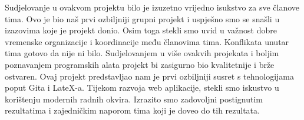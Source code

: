 		Sudjelovanje u ovakvom projektu bilo je izuzetno vrijedno isukstvo za sve članove tima. Ovo je bio naš prvi ozbiljniji grupni projekt i uspješno smo se snašli u izazovima koje je projekt donio. Osim toga stekli smo uvid u važnost dobre vremenske organizacije i koordinacije među članovima tima. Konflikata unutar tima gotovo da nije ni bilo. Sudjelovanjem u više ovakvih projekata i boljim poznavanjem programskih alata projekt bi zasigurno bio kvalitetnije i brže ostvaren. Ovaj projekt predstavljao nam je prvi ozbiljniji susret s tehnologijama poput Gita i LateX-a. Tijekom razvoja web aplikacije, stekli smo iskustvo u korištenju modernih radnih okvira. Izrazito smo zadovoljni postignutim rezultatima i zajedničkim naporom tima koji je doveo do tih rezultata. 
		
	   
		
		
		
		
		
		
		
		
	
		
		 